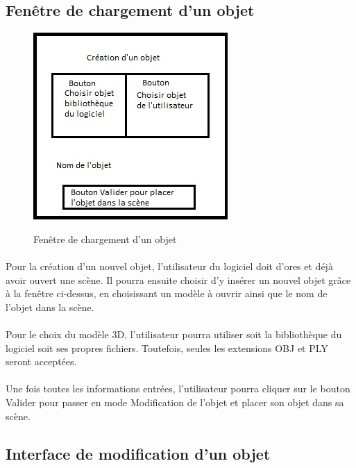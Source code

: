 \subsection{Fenêtre de chargement d'un objet}

\begin{figure}[h]
  \centering
  \includegraphics{chargement}
  \label{fig:chargement}
  \caption{Fenêtre de chargement d'un objet}
\end{figure}

\paragraph{}
Pour la création d’un nouvel objet, l’utilisateur du logiciel doit d’ores et déjà avoir ouvert une scène. Il pourra ensuite choisir d’y insérer un nouvel objet grâce à la fenêtre ci-dessus, en choisissant un modèle à ouvrir ainsi que le nom de l’objet dans la scène.

\paragraph{}
Pour le choix du modèle 3D, l’utilisateur pourra utiliser soit la bibliothèque du logiciel soit ses propres fichiers. Toutefois, seules les extensions OBJ et PLY seront acceptées.

\paragraph{}
Une fois toutes les informations entrées, l’utilisateur pourra cliquer sur le bouton Valider pour passer en mode Modification de l’objet et placer son objet dans sa scène.


\subsection{Interface de modification d'un objet}


